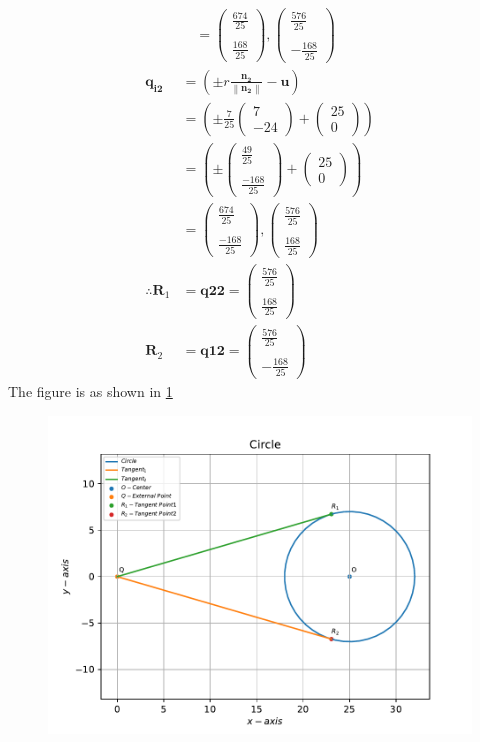 \documentclass[12pt]{article}
\providecommand{\brak}[1]{\ensuremath{\left(#1\right)}}
\providecommand{\norm}[1]{\left\lVert#1\right\rVert}
\newcommand{\myvec}[1]{\ensuremath{\begin{pmatrix}#1\end{pmatrix}}}
\let\vec\mathbf
\begin{document}
\begin{enumerate}
\begin{align}
	&= \myvec{\frac{674}{25} \\ \\[1pt] \frac{168}{25}}, \myvec{\frac{576}{25} \\ \\[1pt] -\frac{168}{25}}
\end{align}
\begin{align}
	\vec{q_{i2}} &= \brak{\pm r \frac{\vec{n_2}}{\norm{\vec{n_2}}}- \vec{u}} \\
	&= \brak{\pm \frac{7}{25}\myvec{7 \\ -24}+ \myvec{25 \\ 0}} \\
	&= \brak{\pm \myvec{\frac{49}{25} \\ \\[1pt] \frac{-168}{25}} + \myvec{25 \\ 0}} \\
	&= \myvec{\frac{674}{25} \\ \\[1pt] \frac{-168}{25}}, \myvec{\frac{576}{25} \\ \\[1pt] \frac{168}{25}}  \\
	\therefore \vec{R}_1 &= \vec{q{22}} = \myvec{\frac{576}{25} \\ \\[1pt] \frac{168}{25}} \\
	\vec{R}_2 &= \vec{q{12}} = \myvec{\frac{576}{25} \\ \\[1pt] -\frac{168}{25}}
\end{align}
The figure is as shown in \ref{fig:Fig1}
\begin{figure}[!h]
	\begin{center}
		\includegraphics[width=\columnwidth]{./figs/problem1.pdf}
	\end{center}
\caption{}
\label{fig:Fig1}
\end{figure}
\end{enumerate}
\end{document}
